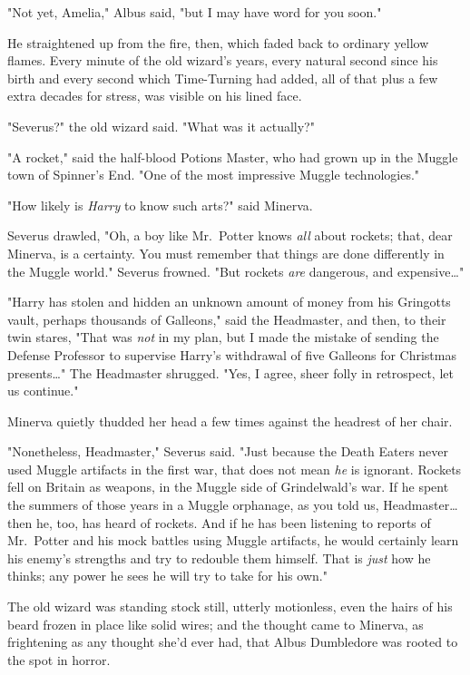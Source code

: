 "Not yet, Amelia," Albus said, "but I may have word for you soon."

He straightened up from the fire, then, which faded back to ordinary yellow
flames. Every minute of the old wizard's years, every natural second since his
birth and every second which Time-Turning had added, all of that plus a few
extra decades for stress, was visible on his lined face.

"Severus?" the old wizard said. "What was it actually?"

"A rocket," said the half-blood Potions Master, who had grown up in the Muggle
town of Spinner's End. "One of the most impressive Muggle technologies."

"How likely is \emph{Harry} to know such arts?" said Minerva.

Severus drawled, "Oh, a boy like Mr.~Potter knows \emph{all} about rockets;
that, dear Minerva, is a certainty. You must remember that things are done
differently in the Muggle world." Severus frowned. "But rockets \emph{are}
dangerous, and expensive{\ldots}"

"Harry has stolen and hidden an unknown amount of money from his Gringotts
vault, perhaps thousands of Galleons," said the Headmaster, and then, to their
twin stares, "That was \emph{not} in my plan, but I made the mistake of sending
the Defense Professor to supervise Harry's withdrawal of five Galleons for
Christmas presents{\ldots}" The Headmaster shrugged. "Yes, I agree, sheer folly
in retrospect, let us continue."

Minerva quietly thudded her head a few times against the headrest of her chair.

"Nonetheless, Headmaster," Severus said. "Just because the Death Eaters never
used Muggle artifacts in the first war, that does not mean \emph{he} is
ignorant. Rockets fell on Britain as weapons, in the Muggle side of
Grindelwald's war. If he spent the summers of those years in a Muggle
orphanage, as you told us, Headmaster{\ldots} then he, too, has heard of
rockets. And if he has been listening to reports of Mr.~Potter and his mock
battles using Muggle artifacts, he would certainly learn his enemy's strengths
and try to redouble them himself. That is \emph{just} how he thinks; any power
he sees he will try to take for his own."

The old wizard was standing stock still, utterly motionless, even the hairs of
his beard frozen in place like solid wires; and the thought came to Minerva, as
frightening as any thought she'd ever had, that Albus Dumbledore was rooted to
the spot in horror.

